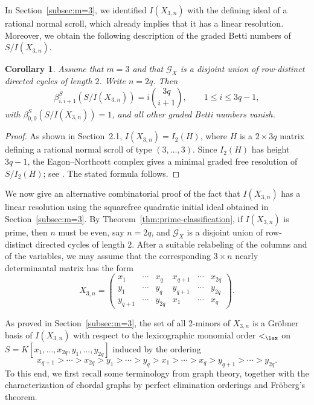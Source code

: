 \documentclass[12pt]{amsart}
\numberwithin{equation}{section}
\newtheorem{Corollary}[Theorem]{Corollary}
\begin{document}
In Section~\ref{subsec:m=3}, we identified $I(X_{3,n})$ with the
defining ideal of a rational normal scroll, which
already implies that it has a linear resolution. Moreover, we obtain the following description of the graded Betti numbers of $S/I(X_{3,n})$.

\begin{Corollary}
Assume that $m=3$ and that $\mathcal G_X$ is a disjoint
union of row-distinct directed cycles of length $2$.
Write $n=2q$. Then
\[
\beta_{i,i+1}^{S}(S/I(X_{3,n}))
=i\binom{3q}{i+1},
\qquad 1\leq i\leq 3q-1,
\]
with $\beta_{0,0}^{S}(S/I(X_{3,n}))=1$,
and all other graded Betti numbers vanish.
\end{Corollary}

\begin{proof}
As shown in Section~2.1, $I(X_{3,n})=I_2(H)$,
where $H$ is a $2\times 3q$ matrix defining a
rational normal scroll of type $(3,\ldots,3)$.
Since $I_2(H)$
has height $3q-1$, the Eagon–Northcott complex gives a minimal graded free resolution of $S/I_2(H)$; see \cite[Appendix A2H]{EisenbudSyzygies}.
The stated formula follows.
\end{proof}



We now give an alternative combinatorial proof of the fact that $I(X_{3,n})$ has a linear resolution
using the squarefree quadratic initial ideal
obtained in Section~\ref{subsec:m=3}. By Theorem~\ref{thm:prime-classification}, if $I(X_{3,n})$ is prime, then $n$ must be even, say $n=2q$, and
$\mathcal G_X$ is a disjoint union of row-distinct directed cycles of
length $2$. After a suitable relabeling of the columns and of the
variables, we may assume that the corresponding $3\times n$ nearly
determinantal matrix has the form
\[
X_{3,n}
=
\begin{pmatrix}
x_1      & \cdots & x_q      & x_{q+1}   & \cdots & x_{2q}\\
y_1      & \cdots & y_q      & y_{q+1}   & \cdots & y_{2q}\\
y_{q+1}  & \cdots & y_{2q}   & x_1       & \cdots & x_q
\end{pmatrix}.
\]

As proved in Section~\ref{subsec:m=3}, the set of all 2-minors
of $X_{3,n}$ is a Gröbner basis of $I(X_{3,n})$ with respect to the lexicographic monomial order $<_{\lex}$ on $S=K[x_1,\ldots,x_{2q},y_1,\ldots,y_{2q}]$ induced by the ordering
\[
x_{q+1}>\cdots>x_{2q}>
y_1>\cdots>y_q>
x_1>\cdots>x_q>
y_{q+1}>\cdots>y_{2q}.
\]
To this end, we first recall some terminology from graph theory, together
with the characterization of chordal graphs by perfect elimination
orderings and Fr\"oberg's theorem.
\end{document}
